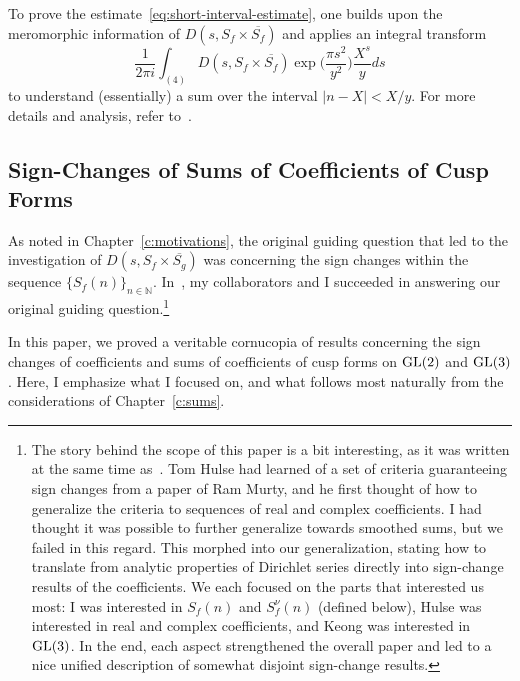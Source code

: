 To prove the estimate~\eqref{eq:short-interval-estimate}, one builds upon the meromorphic
information of $D(s, S_f \times \overline{S_f})$ and applies an integral transform
\begin{equation}
  \frac{1}{2\pi i} \int_{(4)} D(s, S_f \times \overline{S_f}) \exp{\Big(\frac{\pi
  s^2}{y^2} \Big)} \frac{X^s}{y} ds
\end{equation}
to understand (essentially) a sum over the interval $\lvert n - X \rvert < X/y$.
For more details and analysis, refer to~\cite{hkldwShort}.


\subsection*{Sign-Changes of Sums of Coefficients of Cusp Forms}

As noted in Chapter~\ref{c:motivations}, the original guiding question that led to the
investigation of $D(s, S_f \times \overline{S_g})$ was concerning the sign changes within
the sequence $\{S_f(n)\}_{n \in \mathbb{N}}$.
In~\cite{hkldwSigns}, my collaborators and I succeeded in answering our original guiding
question.\footnote{The story behind the scope of this paper is a bit interesting, as it
  was written at the same time as~\cite{hkldwShort}.
  Tom Hulse had learned of a set of criteria guaranteeing sign changes from a paper of Ram
  Murty, and he first thought of how to generalize the criteria to sequences of real and
  complex coefficients.
  I had thought it was possible to further generalize towards smoothed sums, but we failed
  in this regard.
  This morphed into our generalization, stating how to translate from analytic properties
  of Dirichlet series directly into sign-change results of the coefficients.
We each focused on the parts that interested us most: I was interested in $S_f(n)$ and
$S_f^\nu(n)$ (defined below), Hulse was interested in real and complex coefficients, and
Keong was interested in $\operatorname{GL}(3)$.
In the end, each aspect strengthened the overall paper and led to a nice unified
description of somewhat disjoint sign-change results.}

In this paper, we proved a veritable cornucopia of results concerning the sign changes of
coefficients and sums of coefficients of cusp forms on $\operatorname{GL}(2)$ and $\operatorname{GL}(3)$.
Here, I emphasize what I focused on, and what follows most naturally from the
considerations of Chapter~\ref{c:sums}.

